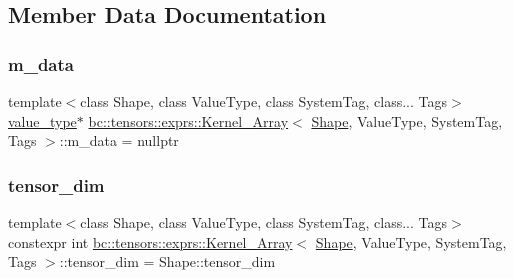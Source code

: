 \subsection{Member Data Documentation}
\mbox{\label{structbc_1_1tensors_1_1exprs_1_1Kernel__Array_a945c43b3cb6c54f6b982c84ea93cfae5}} 
\subsubsection{\texorpdfstring{m\+\_\+data}{m\_data}}
{\footnotesize\ttfamily template$<$class Shape, class Value\+Type, class System\+Tag, class... Tags$>$ \\
\hyperlink{structbc_1_1tensors_1_1exprs_1_1Kernel__Array_ae8195ebc960dd40b6c731a269c00e37b}{value\+\_\+type}$\ast$ \hyperlink{structbc_1_1tensors_1_1exprs_1_1Kernel__Array}{bc\+::tensors\+::exprs\+::\+Kernel\+\_\+\+Array}$<$ \hyperlink{structbc_1_1Shape}{Shape}, Value\+Type, System\+Tag, Tags $>$\+::m\+\_\+data = nullptr\hspace{0.3cm}{\ttfamily [protected]}}

\mbox{\label{structbc_1_1tensors_1_1exprs_1_1Kernel__Array_ae5d17962cb9d81c7e0d205bb8f454d68}} 
\subsubsection{\texorpdfstring{tensor\+\_\+dim}{tensor\_dim}}
{\footnotesize\ttfamily template$<$class Shape, class Value\+Type, class System\+Tag, class... Tags$>$ \\
constexpr int \hyperlink{structbc_1_1tensors_1_1exprs_1_1Kernel__Array}{bc\+::tensors\+::exprs\+::\+Kernel\+\_\+\+Array}$<$ \hyperlink{structbc_1_1Shape}{Shape}, Value\+Type, System\+Tag, Tags $>$\+::tensor\+\_\+dim = Shape\+::tensor\+\_\+dim\hspace{0.3cm}{\ttfamily [static]}}

